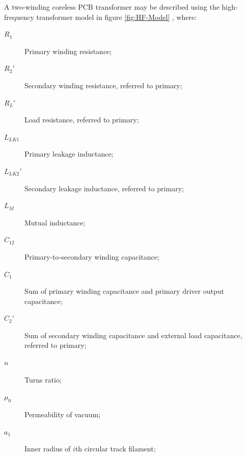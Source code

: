 \documentclass[conference]{IEEEtran}
\begin{document}
A two-winding coreless PCB transformer may be described using the high-frequency transformer model in figure \ref{fig:HF-Model} \cite{TangHuiFundamental}, where:
\begin{description}
\item[\hspace{-10pt}$ R_{1} $]    \hspace{-15pt} Primary winding resistance;
\item[\hspace{-10pt}$ R_{2}' $]   \hspace{-15pt} Secondary winding resistance, referred to primary;
\item[\hspace{-10pt}$ R_{L}' $]   \hspace{-15pt} Load resistance, referred to primary;
\item[\hspace{-10pt}$ L_{LK1} $]  \hspace{-15pt} Primary leakage inductance;
\item[\hspace{-10pt}$ L_{LK2}' $] \hspace{-15pt} Secondary leakage inductance, referred to primary;
\item[\hspace{-10pt}$ L_{M} $]    \hspace{-15pt} Mutual inductance;
\item[\hspace{-10pt}$ C_{12} $]   \hspace{-15pt} Primary-to-secondary winding capacitance;
\item[\hspace{-10pt}$ C_{1} $]    \hspace{-15pt} Sum of primary winding capacitance and primary driver output capacitance;
\item[\hspace{-10pt}$ C_{2}' $]   \hspace{-15pt} Sum of secondary winding capacitance and external load capacitance, referred to primary;
\item[\hspace{-10pt}$ n $]        \hspace{-15pt} Turns ratio;
\item[\hspace{-10pt}$ \mu_{0} $]  \hspace{-15pt} Permeability of vacuum;
\item[\hspace{-10pt}$ a_{1} $]    \hspace{-15pt} Inner radius of $i$th circular track filament;

\end{description}
\end{document}
